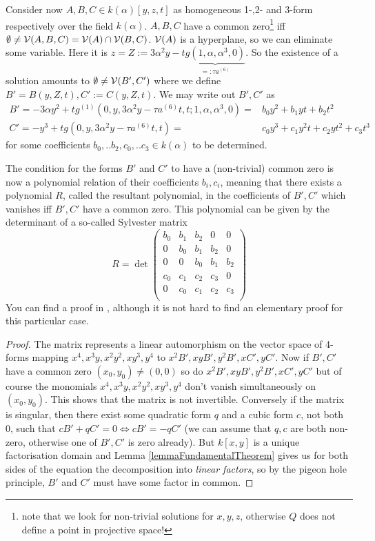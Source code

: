 Consider now $A,B,C \in k(\alpha)[y,z,t]$ as homogeneous 1-,2- and 3-form respectively over the field $k(\alpha)$.
$A,B,C$ have a common zero\footnote{note that we look for non-trivial solutions for $x,y,z$, otherwise $Q$ does not define a point in projective space!} iff $\emptyset \neq \operatorname{\mathcal V}(A,B,C) = \operatorname{\mathcal V}(A) \cap \operatorname{\mathcal V}(B,C)$.
$\operatorname{\mathcal V}(A)$ is a hyperplane, so we can eliminate some variable. Here it is $z = Z := 3\alpha^2 y - t\underset{=: \tau a^{(6)}}{\underbrace{g(1,\alpha,\alpha^3,0)}}$.
So the existence of a solution amounts to $\emptyset \neq \operatorname{\mathcal V}(B',C')$ where we define $B' = B(y,Z,t), C' := C(y,Z,t)$.
We may write out $B',C'$ as
\begin{align}
B' = -3\alpha y^2 + tg^{(1)}(0,y,3\alpha^2y - \tau a^{(6)}t,t;1,\alpha,\alpha^3,0) =& b_0y^2 + b_1yt + b_2 t^2 \\
C' = -y^3 + tg(0,y,3\alpha^2y-\tau a^{(6)}t,t) =& c_0y^3 + c_1y^2t + c_2 yt^2 + c_3t^3
\end{align}
for some coefficients $b_0,..b_2,c_0,..c_3 \in k(\alpha)$ to be determined.

The condition for the forms $B'$ and $C'$ to have a (non-trivial) common zero is now a polynomial relation of their coefficients $b_i,c_i$, meaning that there exists a polynomial $R$, called the resultant polynomial, in the coefficients of $B',C'$ which vanishes iff $B',C'$ have a common zero.
This polynomial can be given by the determinant of a so-called Sylvester matrix
\begin{equation}
R =
\det\begin{pmatrix}
b_0 & b_1 & b_2 & 0 & 0 \\
0 & b_0 & b_1 & b_2 & 0 \\
0 & 0 & b_0 & b_1 & b_2 \\
c_0 & c_1 & c_2 & c_3 & 0 \\
0 & c_0 & c_1 & c_2 & c_3 \\
\end{pmatrix}
\end{equation}
You can find a proof in \cite[theorem 4.2.3]{brieskorn2012plane}, although it is not hard to find an elementary proof for this particular case.
\begin{proof}
The matrix represents a linear automorphism on the vector space of 4-forms mapping $x^4,x^3y,x^2y^2,xy^3,y^4$ to $x^2B',xyB',y^2B',xC',yC'$.
Now if $B',C'$ have a common zero $(x_0,y_0) \neq (0,0)$ so do $x^2B',xyB',y^2B',xC',yC'$ but of course the monomials $x^4,x^3y,x^2y^2,xy^3,y^4$ don't vanish simultaneously on $(x_0,y_0)$. This shows that the matrix is not invertible.
Conversely if the matrix is singular, then there exist some quadratic form $q$ and a cubic form $c$, not both 0, such that $cB' + qC' = 0 \Leftrightarrow cB' = -qC'$ (we can assume that $q,c$ are both non-zero, otherwise one of $B',C'$ is zero already).
But $k[x,y]$ is a unique factorisation domain and Lemma \ref{lemmaFundamentalTheorem} gives us for both sides of the equation the decomposition into \emph{linear factors}, so by the pigeon hole principle, $B'$ and $C'$ must have some factor in common.
\end{proof}

